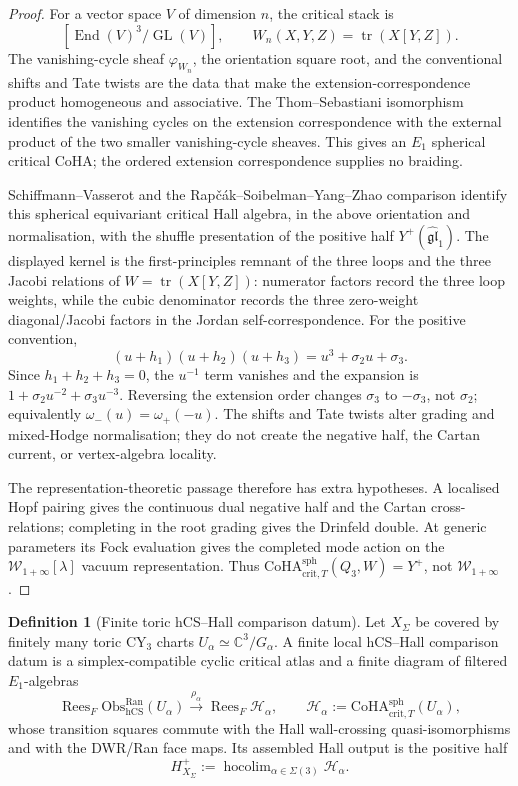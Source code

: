 \documentclass[11pt]{amsart}
\providecommand{\bC}{\mathbb{C}}
\providecommand{\cW}{\mathcal{W}}
\providecommand{\CoHA}{\mathrm{CoHA}}
\providecommand{\hCS}{\mathrm{hCS}}
\providecommand{\End}{\operatorname{End}}
\providecommand{\Obs}{\mathrm{Obs}}
\theoremstyle{definition}
\newtheorem{definition}[theorem]{Definition}
\theoremstyle{remark}
\begin{document}
\begin{proof}
For a vector space \(V\) of dimension \(n\), the critical stack is
\[
        [\End(V)^3/\operatorname{GL}(V)],
        \qquad
        W_n(X,Y,Z)=\operatorname{tr}(X[Y,Z]).
\]
The vanishing-cycle sheaf \(\varphi_{W_n}\), the orientation square root,
and the conventional shifts and Tate twists are the data that make the
extension-correspondence product homogeneous and associative. The
Thom--Sebastiani isomorphism identifies the vanishing cycles on the
extension correspondence with the external product of the two smaller
vanishing-cycle sheaves. This gives an \(E_1\) spherical critical CoHA; the
ordered extension correspondence supplies no braiding.

Schiffmann--Vasserot and the Rap\v{c}\'ak--Soibelman--Yang--Zhao
comparison identify this spherical equivariant critical Hall algebra, in
the above orientation and normalisation, with the shuffle presentation of
the positive half \(Y^+(\widehat{\mathfrak{gl}}_1)\). The displayed kernel
is the first-principles remnant of the three loops and the three Jacobi
relations of \(W=\operatorname{tr}(X[Y,Z])\): numerator factors record the
three loop weights, while the cubic denominator records the three
zero-weight diagonal/Jacobi factors in the Jordan self-correspondence. For
the positive convention,
\[
        (u+h_1)(u+h_2)(u+h_3)
        =u^3+\sigma_2u+\sigma_3 .
\]
Since \(h_1+h_2+h_3=0\), the \(u^{-1}\) term vanishes and the expansion is
\(1+\sigma_2u^{-2}+\sigma_3u^{-3}\). Reversing the extension order changes
\(\sigma_3\) to \(-\sigma_3\), not \(\sigma_2\); equivalently
\(\omega_-(u)=\omega_+(-u)\). The shifts and Tate twists alter grading and
mixed-Hodge normalisation; they do not create the negative half, the
Cartan current, or vertex-algebra locality.

The representation-theoretic passage therefore has extra hypotheses. A
localised Hopf pairing gives the continuous dual negative half and the
Cartan cross-relations; completing in the root grading gives the Drinfeld
double. At generic parameters its Fock evaluation gives the completed
mode action on the \(\cW_{1+\infty}[\lambda]\) vacuum representation.
Thus
\(\CoHA^{\mathrm{sph}}_{\mathrm{crit},T}(Q_3,W)=Y^+\), not
\(\cW_{1+\infty}\).
\end{proof}

\begin{definition}[Finite toric hCS--Hall comparison datum]
Let \(X_\Sigma\) be covered by finitely many toric CY$_3$ charts
\(U_\alpha\simeq\bC^3/G_\alpha\). A finite local hCS--Hall comparison
datum is a simplex-compatible cyclic critical atlas and a finite diagram
of filtered \(E_1\)-algebras
\[
        \operatorname{Rees}_F
        \Obs^{\mathrm{Ran}}_{\hCS}(U_\alpha)
        \xrightarrow{\rho_\alpha}
        \operatorname{Rees}_F\mathcal{H}_\alpha ,
        \qquad
        \mathcal{H}_\alpha:=\CoHA^{\mathrm{sph}}_{\mathrm{crit},T}(U_\alpha),
\]
whose transition squares commute with the Hall wall-crossing
quasi-isomorphisms and with the DWR/Ran face maps. Its assembled Hall
output is the positive half
\[
        H^+_{X_\Sigma}:=
        \operatorname{hocolim}_{\alpha\in\Sigma(3)}\mathcal{H}_\alpha .
\]
\end{definition}
\end{document}
